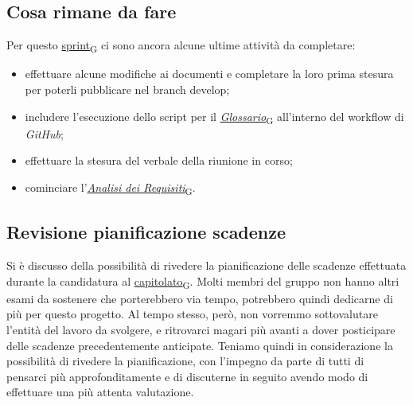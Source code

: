 \documentclass[italian,12pt]{article}
\begin{document}
\subsection{Cosa rimane da fare}
Per questo \href{https://7last.github.io/docs/rtb/documentazione-interna/glossario#sprint}{sprint\textsubscript{G}} ci sono ancora alcune ultime attività da completare:
\begin{itemize}
	\item effettuare alcune modifiche ai documenti e completare la loro prima stesura per poterli pubblicare nel branch develop;
	\item includere l'esecuzione dello script per il \href{https://7last.github.io/docs/rtb/documentazione-interna/glossario\#glossario}{\textit{Glossario}\textsubscript{G}} all'interno del workflow di \textit{GitHub};
	\item effettuare la stesura del verbale della riunione in corso;
	\item cominciare l'\href{https://7last.github.io/docs/rtb/documentazione-interna/glossario#analisi-dei-requisiti}{\textit{Analisi dei Requisiti}\textsubscript{G}}.
\end{itemize}

\subsection{Revisione pianificazione scadenze}
Si è discusso della possibilità di rivedere la pianificazione delle scadenze effettuata durante la candidatura al \href{https://7last.github.io/docs/rtb/documentazione-interna/glossario#capitolato}{capitolato\textsubscript{G}}. Molti membri del gruppo non hanno altri esami da sostenere che porterebbero via tempo, potrebbero quindi dedicarne di più per questo progetto. Al tempo stesso, però, non vorremmo sottovalutare l'entità del lavoro da svolgere, e ritrovarci magari più avanti a dover posticipare delle scadenze precedentemente anticipate. Teniamo quindi in considerazione la possibilità di rivedere la pianificazione, con l'impegno da parte di tutti di pensarci più approfonditamente e di discuterne in seguito avendo modo di effettuare una più attenta valutazione.
\end{document}
